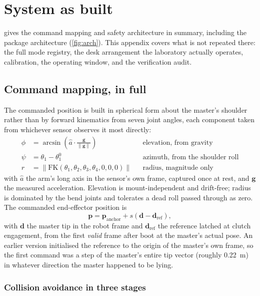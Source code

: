 \chapter{System as built}
\label{ch:method}

 gives the command mapping and safety architecture in
summary, including the package architecture (\cref{fig:arch}). This
appendix covers what is not repeated there: the full mode registry, the
desk arrangement the laboratory actually operates, calibration, the
operating window, and the verification audit.

\section{Command mapping, in full}

The commanded position is built in spherical form about the master's
shoulder rather than by forward kinematics from seven joint angles, each
component taken from whichever sensor observes it most directly:
\begin{align}
  \phi &= \arcsin\!\left(\hat{a}\cdot\frac{\mathbf{g}}{\lVert\mathbf{g}\rVert}\right)
    &&\text{elevation, from gravity} \label{eq:elev}\\
  \psi &= \theta_1-\theta_1^0 &&\text{azimuth, from the shoulder roll} \label{eq:azim}\\
  r &= \lVert\mathrm{FK}(\theta_1,\theta_2,\theta_3,\theta_4,0,0,0)\rVert &&\text{radius, magnitude only} \label{eq:reach}
\end{align}
with $\hat{a}$ the arm's long axis in the sensor's own frame, captured once
at rest, and $\mathbf{g}$ the measured acceleration. Elevation is
mount-independent and drift-free; radius is dominated by the bend joints and
tolerates a dead roll passed through as zero. The commanded end-effector
position is
\begin{equation}
  \mathbf{p} = \mathbf{p}_{\text{anchor}} + s(\mathbf{d}-\mathbf{d}_{\text{ref}}),
  \label{eq:anchor}
\end{equation}
with $\mathbf{d}$ the master tip in the robot frame and
$\mathbf{d}_{\text{ref}}$ the reference latched at clutch engagement, from
the first \emph{valid} frame after boot at the master's actual pose. An
earlier version initialised the reference to the origin of the master's own
frame, so the first command was a step of the master's entire tip vector
(roughly \SI{0.22}{\metre}) in whatever direction the master happened to be
lying.

\subsection{Collision avoidance in three stages}
\label{sec:clearance}

